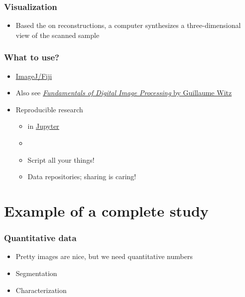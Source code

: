 \begin{frame}
	\frametitle{Visualization}
	\begin{itemize}
		\item Based the on reconstructions, a computer synthesizes a three-dimensional view of the scanned sample
	\end{itemize}
\end{frame}

\begin{frame}
	\frametitle{What to use?}
	\begin{itemize}
		\item \href{http://fiji.sc/}{ImageJ/Fiji}~\cite{Schindelin2012}
		\item Also see \href{https://ilias.unibe.ch/goto_ilias3_unibe_sess_2177933.html}{\emph{Fundamentals of Digital Image Processing} by Guillaume Witz}
		\item Reproducible research
		\begin{itemize}
			\item \href{https://www.python.org/}{\faPython} in \href{https://jupyter.org/}{Jupyter}~\cite{Kluyver2016}
			\item \href{https://git-scm.com/}{\faGit}
			\item Script all your things!
			\item Data repositories; \ie sharing is caring!
		\end{itemize}
	\end{itemize}
\end{frame}

\section{Example of a complete study}
\begin{frame}
	\frametitle{Quantitative data}
	\begin{itemize}
		\item Pretty images are nice, but we need quantitative numbers
		\item Segmentation
		\item Characterization
	\end{itemize}
\end{frame}

